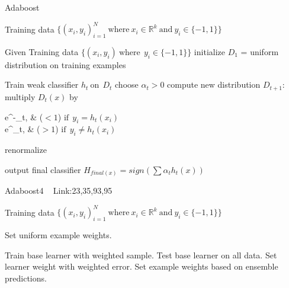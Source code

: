 \documentclass[a4paper]{article}
\begin{document}
  \begin{algorithm}
   \caption{Adaboost ~\cite{adaboostsecond}}
    \begin{algorithmic}[1]
    \INPUT 
    \Statex Training data $\{(x_i,y_i)_{i=1}^N \ \text{where}\ x_i \in  \mathbb{R}^k \ \text{and} \  y_i \in \{-1,1\} \}$
   
    \State Given Training data $\{(x_i,y_i) \ \text{where}\  \  y_i \in \{-1,1\} \}$
    \State initialize $D_1$ = uniform distribution on training examples
   
            \State Train weak classifier $h_t \  \text{on}\   \   D_t $
            \State choose $\alpha_t > 0 $
            \State compute new distribution $D_{t+1}$:
              \State multiply $D_t(x)$ by \begin{numcases}{}
  e^{-\alpha_t}, &  ($<1$) $ \text{if}\  \  y_i = h_t(x_i) $\\
   e^{\alpha_t}, & ($>1$) $ \text{if}\  \  y_i \neq h_t(x_i) $
\end{numcases}
\State renormalize
         \EndFor 
         
  \State output final classifier $H_{final(x)} = sign (\sum\alpha_t h_t(x))$
            
        
        
         
        
        \EndFor
        
       


\end{algorithmic}
\end{algorithm}


 \begin{algorithm}
   \caption{Adaboost4 ~\cite{adaboostsecond} Link:23,35,93,95}
    \begin{algorithmic}[1]
     \INPUT 
    \Statex Training data $\{(x_i,y_i)_{i=1}^N \ \text{where}\ x_i \in  \mathbb{R}^k \ \text{and} \  y_i \in \{-1,1\} \}$
   
     
     \State Set uniform example weights.
     
      \State Train base learner with weighted sample.
      \State Test base learner on all data.
      \State Set learner weight with weighted error.
      \State Set example weights based on ensemble predictions.




   
      \EndFor

  
\end{algorithmic}
\end{algorithm}
\end{document}
